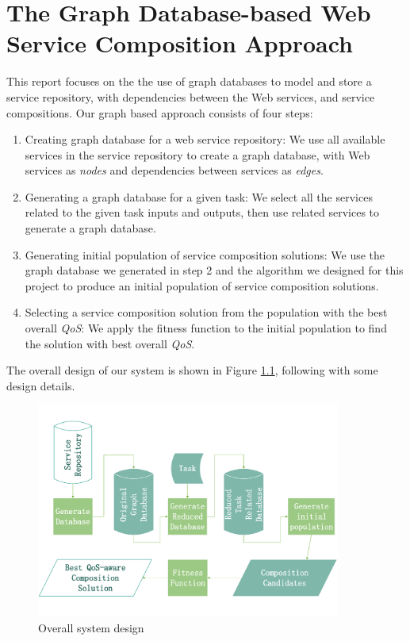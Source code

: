\chapter{The Graph Database-based Web Service Composition Approach}\label{C:wd}
This report focuses on the the use of graph databases to model and store a service repository, with dependencies between the Web services, and service compositions. Our graph based approach consists of four steps:\par
\begin{enumerate}
  \item Creating graph database for a web service repository: We use all available services in the service repository to create a graph database, with Web services as \emph{nodes} and dependencies between services as \emph{edges}.\par

  \item Generating a graph database for a given task: We select all the services related to the given task inputs and outputs, then use related services to generate a graph database.\par

  \item Generating initial population of service composition solutions: We use the graph database we generated in step 2 and the algorithm we designed for this project to produce an initial population of service composition solutions.\par

  \item Selecting a service composition solution from the population with the best overall \emph{QoS}: We apply the fitness function to the initial population to find the solution with best overall \emph{QoS}.\par

\end{enumerate}
The overall design of our system is shown in Figure \ref{fig:process}, following with some design details.\par

\begin{figure}[H]
\includegraphics[width=10cm]{process2.pdf}
\centering
\caption{Overall system design}
\label{fig:process} 
\end{figure} 

